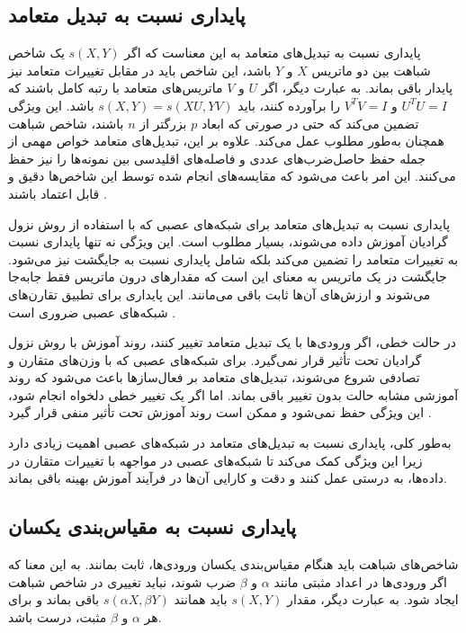 \subsection{پایداری نسبت به تبدیل متعامد}

پایداری نسبت به تبدیل‌های متعامد به این معناست که اگر \( s(X, Y) \) یک شاخص شباهت بین دو ماتریس \( X \) و \( Y \) باشد، این شاخص باید در مقابل تغییرات متعامد نیز پایدار باقی بماند. به عبارت دیگر، اگر \( U \) و \( V \) ماتریس‌های متعامد با رتبه کامل%
باشند که \( U^TU = I \) و \( V^TV = I \) را برآورده کنند، باید \( s(X, Y) = s(XU, YV) \) باشد. این ویژگی تضمین می‌کند که حتی در صورتی که ابعاد \( p \) بزرگتر از \( n \) باشند، شاخص شباهت همچنان به‌طور مطلوب عمل می‌کند. علاوه بر این، تبدیل‌های متعامد خواص مهمی از جمله حفظ حاصل‌ضرب‌های عددی و فاصله‌های اقلیدسی%
بین نمونه‌ها را نیز حفظ می‌کنند. این امر باعث می‌شود که مقایسه‌های انجام شده توسط این شاخص‌ها دقیق و قابل اعتماد باشند
\cite{kornblith2019similarity}.

پایداری نسبت به تبدیل‌های متعامد برای شبکه‌های عصبی که با استفاده از روش نزول گرادیان آموزش داده می‌شوند، بسیار مطلوب است. این ویژگی نه تنها پایداری نسبت به تغییرات متعامد را تضمین می‌کند بلکه شامل پایداری نسبت به جایگشت نیز می‌شود. جایگشت در یک ماتریس به معنای این است که مقدارهای درون ماتریس فقط جابه‌جا می‌شوند و ارزش‌های آن‌ها ثابت باقی می‌مانند. این پایداری برای تطبیق تقارن‌های شبکه‌های عصبی ضروری است
\cite{chen1993geometry, orhan2017skip}.

در حالت خطی، اگر ورودی‌ها با یک تبدیل متعامد تغییر کنند، روند آموزش با روش نزول گرادیان تحت تأثیر قرار نمی‌گیرد. برای شبکه‌های عصبی که با وزن‌های متقارن و تصادفی شروع می‌شوند، تبدیل‌های متعامد بر فعال‌سازها باعث می‌شود که روند آموزشی مشابه حالت بدون تغییر باقی بماند. اما اگر یک تغییر خطی دلخواه انجام شود، این ویژگی حفظ نمی‌شود و ممکن است روند آموزش تحت تأثیر منفی قرار گیرد
\cite{lecun1990second}.

به‌طور کلی، پایداری نسبت به تبدیل‌های متعامد در شبکه‌های عصبی اهمیت زیادی دارد زیرا این ویژگی کمک می‌کند تا شبکه‌های عصبی در مواجهه با تغییرات متقارن در داده‌ها، به درستی عمل کنند و دقت و کارایی آن‌ها در فرآیند آموزش بهینه باقی بماند.



\subsection{پایداری نسبت به مقیاس‌بندی یکسان}

شاخص‌های شباهت باید هنگام مقیاس‌بندی یکسان ورودی‌ها، ثابت بمانند. به این معنا که اگر ورودی‌ها در اعداد مثبتی مانند \(\alpha\) و \(\beta\) ضرب شوند، نباید تغییری در شاخص شباهت ایجاد شود. به عبارت دیگر، مقدار \( s(X, Y) \) باید همانند \( s(\alpha X, \beta Y) \) باقی بماند و برای هر \(\alpha\) و \(\beta\) مثبت، درست باشد.

